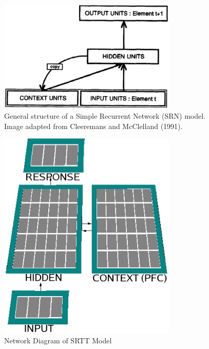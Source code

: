 \begin{figure}[t]
\begin{center}
	\includegraphics[width=85mm]{figures/srn.eps}
\end{center}
\caption{General structure of a Simple Recurrent Network (SRN) model.  Image adapted from Cleeremans and McClelland (1991).}
\label{SRN-Model}
\end{figure} 

\begin{figure}[t]
\begin{center}
	\includegraphics[width=85mm]{figures/srtt_network.eps}
\end{center}
\caption{Network Diagram of SRTT Model} 
\label{network-diagram-srtt}
\end{figure}

